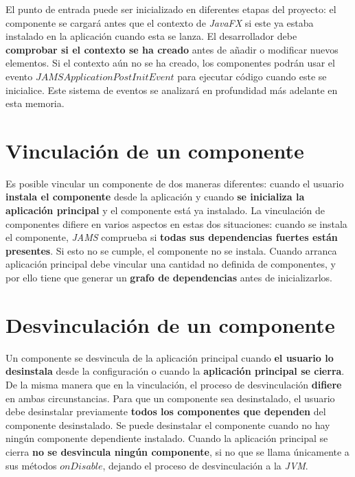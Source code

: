 El punto de entrada puede ser inicializado en diferentes
etapas del proyecto: el componente se cargará antes que el contexto
de \textit{JavaFX} si este ya estaba instalado en la aplicación
cuando esta se lanza.
El desarrollador debe \textbf{comprobar si el contexto se ha creado}
antes de añadir o modificar nuevos elementos.
Si el contexto aún no se ha creado, los componentes podrán
usar el evento $JAMSApplicationPostInitEvent$ para ejecutar
código cuando este se inicialice.
Este sistema de eventos se analizará en profundidad más adelante en esta memoria.


\section{Vinculación de un componente}\label{sec:vinculacion-de-un-componente}

Es posible vincular un componente de dos maneras diferentes:
cuando el usuario \textbf{instala el componente} desde la aplicación
y cuando \textbf{se inicializa la aplicación principal} y el componente
está ya instalado.
La vinculación de componentes difiere en varios aspectos en estas
dos situaciones: cuando se instala el componente, \textit{JAMS}
comprueba si \textbf{todas sus dependencias fuertes están presentes}.
Si esto no se cumple, el componente no se instala.
Cuando arranca aplicación principal debe vincular
una cantidad no definida de componentes, y por ello tiene que
generar un \textbf{grafo de dependencias} antes de inicializarlos.

\section{Desvinculación de un componente}\label{sec:desvinculacion-de-un-componente}

Un componente se desvincula de la aplicación principal
cuando \textbf{el usuario lo desinstala} desde
la configuración o cuando la \textbf{aplicación principal se cierra}.
De la misma manera que en la vinculación, el proceso de
desvinculación \textbf{difiere} en ambas circunstancias.
Para que un componente sea desinstalado, el usuario
debe desinstalar previamente \textbf{todos los componentes
que dependen} del componente desinstalado.
Se puede desinstalar el componente cuando no hay
ningún componente dependiente instalado.
Cuando la aplicación principal se cierra
\textbf{no se desvincula ningún componente},
si no que se llama únicamente a sus métodos $onDisable$, dejando
el proceso de desvinculación a la \textit{JVM}.

